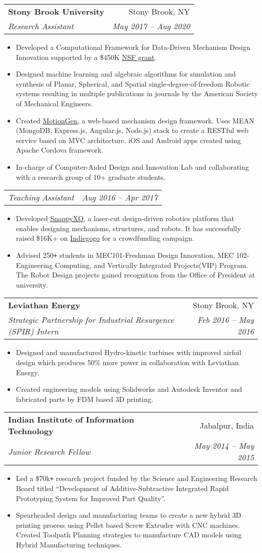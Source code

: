 \documentclass[letterpaper,10pt]{article}
\makeatletter
\newcommand{\resumeHeading}[4]{
  \vspace{-1pt}
    \begin{tabular*}{0.97\textwidth}{l@{\extracolsep{\fill}}r}
      \textbf{#1} & #2 \vspace{-2pt}\\ \vspace{1pt}
      \textit{\small#3} & \textit{\small #4} \\
    \end{tabular*}
}
\newcommand{\resumeSubheadingWithDate}[2]{
    \begin{tabular*}{0.97\textwidth}{l@{\extracolsep{\fill}}r}
      \textit{\small#1} & \textit{\small #2}\\
    \end{tabular*}
    \vspace{+2pt}
}
\newcommand{\resumeItemListStart}{
\vspace{-7pt}
\begin{itemize}[leftmargin=14pt]
}
\newcommand{\resumeItemListEnd}{
\vspace{+7pt}
\end{itemize}
}
\newcommand{\resumeItem}[1]{
  \item\small{
      {#1 \vspace{-7pt}
      }
  }
}
\makeatother
\begin{document}
\resumeHeading
{Stony Brook University}{Stony Brook, NY}
{Research Assistant}{May 2017 -- Aug 2020}
\resumeItemListStart
\resumeItem{Developed a Computational Framework for Data-Driven Mechanism Design Innovation supported by a \$450K \href{https://nsf.gov/awardsearch/showAward?AWD_ID=1563413}{NSF grant}.}
\resumeItem{Designed machine learning and algebraic algorithms for simulation and synthesis of Planar, Spherical, and Spatial single-degree-of-freedom Robotic systems resulting in multiple publications in journals by the American Society of Mechanical Engineers.}
\resumeItem{Created \href{http://cadcam.eng.sunysb.edu/}{MotionGen}, a web-based mechanism design framework. Uses MEAN (MongoDB, Express.js, Angular.js, Node.js) stack to create a RESTful web service based on MVC architecture. iOS and Android apps created using Apache Cordova framework.}
\resumeItem{In-charge of Computer-Aided Design and Innovation Lab and collaborating with a research group of 10+ graduate students.}
\resumeItemListEnd

\resumeSubheadingWithDate{Teaching Assistant}{Aug 2016 -- Apr 2017}
\resumeItemListStart
\resumeItem{Developed \href{http://snappyxo.com/}{SnappyXO}, a laser-cut design-driven robotics platform that enables designing mechanisms, structures, and robots. It has successfully raised \$16K+ on \href{https://www.indiegogo.com/projects/snappyxo-a-design-driven-robotics-education-kit}{Indiegogo} for a crowdfunding campaign.}
\resumeItem{Advised 250\texttt{+} students in MEC101-Freshman Design Innovation, MEC 102-Engineering Computing, and Vertically Integrated Projects(VIP) Program. The Robot Design projects gained recognition from the Office of President at university.}
\resumeItemListEnd

\resumeHeading
{Leviathan Energy}{Stony Brook, NY}
{Strategic Partnership for Industrial Resurgence (SPIR) Intern}{Feb 2016 – May 2016}
\resumeItemListStart
\resumeItem{Designed and manufactured Hydro-kinetic turbines with improved airfoil design which produces 50\% more power in collaboration with Leviathan Energy.}
\resumeItem{Created engineering models using Solidworks and Autodesk Inventor and fabricated parts by FDM based 3D printing.}
\resumeItemListEnd

\resumeHeading
{Indian Institute of Information Technology}{Jabalpur, India}
{Junior Research Fellow}{May 2014 -- May 2015}
\resumeItemListStart
\resumeItem{Led a \$70k\texttt{+} research project funded by the Science and Engineering Research Board titled “Development of Additive-Subtractive Integrated Rapid Prototyping System for Improved Part Quality”.}
\resumeItem{Spearheaded design and manufacturing teams to create a new hybrid 3D printing process using Pellet based Screw Extruder with CNC machines. Created Toolpath Planning strategies to manufacture CAD models using Hybrid Manufacturing techniques.}
\resumeItemListEnd
\end{document}
